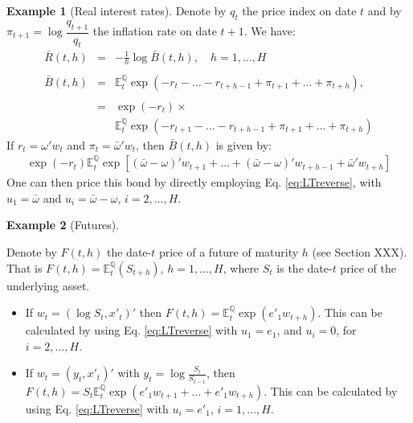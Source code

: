 \documentclass[
  12pt,
]{book}
\theoremstyle{definition}
\theoremstyle{definition}
\newtheorem{example}{Example}[chapter]
\theoremstyle{definition}
\theoremstyle{definition}
\theoremstyle{remark}
\begin{document}
\begin{example}[Real interest rates]
\protect\hypertarget{exm:realBth}{}\label{exm:realBth}Denote by \(q_t\) the price index on date \(t\) and by \(\pi_{t+1} = \log \dfrac{q_{t+1}}{q_t}\) the inflation rate on date \(t+1\). We have:
\begin{eqnarray*}
\bar{R}(t,h) & =& -   \frac{1}{h}   \log   \bar{B}(t,h), \quad h=1,\dots,H \\    \\
\bar{B}(t,h) & =&  \mathbb{E}^{\mathbb{Q}}_t   \exp(-r_{t}-\dots-r_{t+h-1} + \pi_{t+1}+\dots+\pi_{t+h}),  \\      \\
& =& \exp(-r_{t}) \times \\
&& \mathbb{E}^{\mathbb{Q}}_t \exp(-r_{t+1}-\dots-r_{t+h-1}+\pi_{t+1}+\dots+\pi_{t+h})
\end{eqnarray*}
If \(r_t = \omega'w_t\) and \(\pi_t = \bar\omega'w_t\), then \(\bar{B}(t,h)\) is given by:
\begin{eqnarray*}
\exp(-r_{t}) \mathbb{E}^{\mathbb{Q}}_t \exp[(\bar\omega-\omega)'w_{t+1}+\dots+(\bar\omega-\omega)'w_{t+h-1}+\bar\omega'
w_{t+h}]
\end{eqnarray*}
One can then price this bond by directly employing Eq. \eqref{eq:LTreverse}, with \(u_1 = \bar\omega\) and \(u_i = \bar\omega-\omega\), \(i = 2,\dots, H\).
\end{example}

\begin{example}[Futures]
\protect\hypertarget{exm:Futures}{}\label{exm:Futures}

Denote by \(F(t,h)\) the date-\(t\) price of a future of maturity \(h\) (see Section XXX). That is \(F(t,h) = \mathbb{E}^{\mathbb{Q}}_t (S_{t+h})\), \(h=1,\dots,H\), where \(S_t\) is the date-\(t\) price of the underlying asset.

\begin{itemize}
\item
  If \(w_t = (\log S_t, x'_t)'\) then \(F(t,h) = \mathbb{E}^{\mathbb{Q}}_t \exp(e'_1 w_{t+h})\). This can be calculated by using Eq. \eqref{eq:LTreverse} with \(u_1 = e_1\), and \(u_i = 0\), for \(i=2,\dots,H\).
\item
  If \(w_t = (y_t, x'_t)'\) with \(y_t = \log\frac{S_t}{S_{t-1}}\), then \(F(t,h) = S_t \mathbb{E}^{\mathbb{Q}}_t \exp(e'_1 w_{t+1}+\dots+e'_1 w_{t+h})\). This can be calculated by using Eq. \eqref{eq:LTreverse} with \(u_i = e'_1\), \(i=1,\dots,H\).
\end{itemize}

\end{example}
\end{document}
